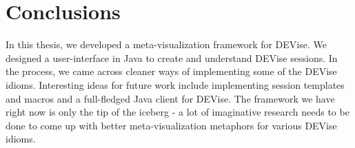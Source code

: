 \section{Conclusions}
\label{sec:concl}

In this thesis, we developed a meta-visualization framework for DEVise.
We designed a user-interface in Java to create and understand DEVise
sessions. In the process, we came across cleaner ways of implementing
some of the DEVise idioms. Interesting ideas for future work include
implementing session templates and macros and a full-fledged Java
client for DEVise. The framework we have right now is only the tip of the
iceberg - a lot of imaginative research needs to be done to come
up with better meta-visualization metaphors for various DEVise idioms.




